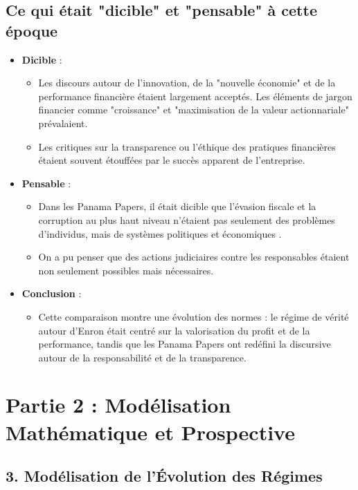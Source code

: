 \documentclass{article}
\begin{document}
\subsection{Ce qui était "dicible" et "pensable" à cette époque}
\begin{itemize}
    \item \textbf{Dicible} :
    \begin{itemize}
        \item Les discours autour de l'innovation, de la "nouvelle économie" et de la performance financière étaient largement acceptés. Les éléments de jargon financier comme "croissance" et "maximisation de la valeur actionnariale" prévalaient.
        \item Les critiques sur la transparence ou l'éthique des pratiques financières étaient souvent étouffées par le succès apparent de l'entreprise.
    \end{itemize}
    \item \textbf{Pensable} :
    \begin{itemize}
        \item Dans les Panama Papers, il était dicible que l'évasion fiscale et la corruption au plus haut niveau n'étaient pas seulement des problèmes d'individus, mais de systèmes politiques et économiques .
        \item On a pu penser que des actions judiciaires contre les responsables étaient non seulement possibles mais nécessaires.
    \end{itemize}

    \item \textbf{Conclusion} :
    \begin{itemize}
        \item Cette comparaison montre une évolution des normes : le régime de vérité autour d'Enron était centré sur la valorisation du profit et de la performance, tandis que les Panama Papers ont redéfini la discursive autour de la responsabilité et de la transparence.
    \end{itemize}
\end{itemize}

\section{Partie 2 : Modélisation Mathématique et Prospective}

\subsection{3. Modélisation de l'Évolution des Régimes}
\end{document}

